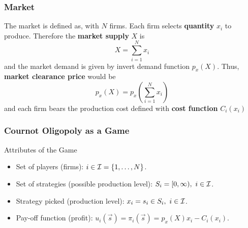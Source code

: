 \documentclass[]{article}
\begin{document}
            \subsubsection{Market}
                \begin{definition}
                    The market is defined as, with $N$ firms. Each firm selects \textbf{quantity} $x_i$ to produce. Therefore the \textbf{market supply} $X$ is 
                    \[
                        X = \sum_{i=1}^N{x_i}
                    \]
                    and the market demand is given by invert demand function $p_x(X)$. Thus, \textbf{market clearance price} would be 
                    \[
                        p_x(X) = p_x(\sum_{i=1}^N{x_i})
                    \]
                    and each firm bears the production cost defined with \textbf{cost function} $C_i(x_i)$
                \end{definition}
                
            \subsubsection{Cournot Oligopoly as a Game}
                \begin{remark} Attributes of the Game
                    \begin{itemize}
                        \item Set of players (firms): $i \in \mathcal{{I}} = \{1,\dots,N\}$.
                        \item Set of strategies (possible production level): $S_i = [0, \infty),\ i \in \mathcal{{I}}$.
                        \item Strategy picked (production level): $x_i = s_i \in S_i,\ i \in \mathcal{{I}}$.
                        \item Pay-off function (profit): $u_i(\vec{s}) = \pi_i(\vec{s}) = p_x(X)x_i - C_i(x_i)$.
                    \end{itemize}
                \end{remark}
            
\end{document}
